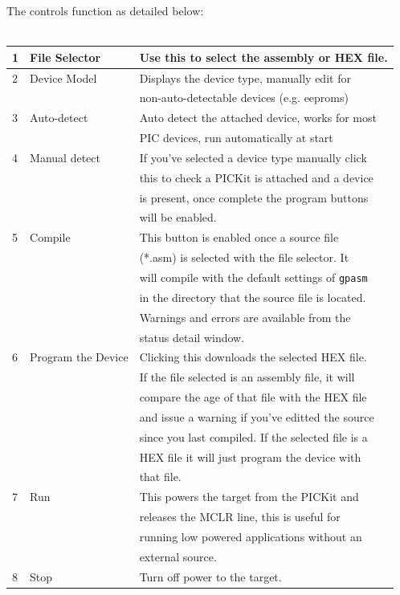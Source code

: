 \documentclass[a4paper,10pt]{article}
\begin{document}
The controls function as detailed below:\\\\
\begin{tabular}{lll}
 1&File Selector&Use this to select the assembly or HEX file.\\
 \hline
 2&Device Model&Displays the device type, manually edit for\\
 &&non-auto-detectable devices (e.g. eeproms)\\
 \hline
 3&Auto-detect&Auto detect the attached device, works for most\\
 &&PIC devices, run automatically at start\\
 \hline
 4&Manual detect&If you've selected a device type manually click\\
 &&this to check a PICKit is attached and a device\\
 &&is present, once complete the program buttons\\
 &&will be enabled.\\
 \hline
 5&Compile&This button is enabled once a source file\\
 &&(*.asm) is selected with the file selector.  It\\
 &&will compile with the default settings of \texttt{gpasm}\\
 &&in the directory that the source file is located.\\
 &&Warnings and errors are available from the\\
 &&status detail window.\\
 \hline
 6&Program the Device&Clicking this downloads the selected HEX file.\\
 &&If the file selected is an assembly file, it will\\
 &&compare the age of that file with the HEX file\\
 &&and issue a warning if you've editted the source\\
 &&since you last compiled.  If the selected file is a\\
 &&HEX file it will just program the device with\\
 &&that file.\\
 \hline
 7&Run&This powers the target from the PICKit and\\
 &&releases the MCLR line, this is useful for\\
 &&running low powered applications without an\\
 &&external source.\\
 \hline
 8&Stop&Turn off power to the target.\\

\end{tabular}
\end{document}
